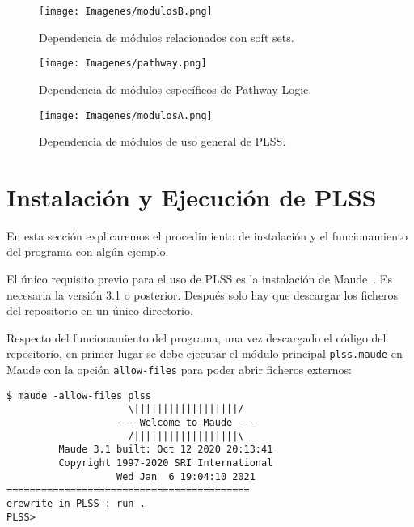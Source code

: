 \begin{figure}[h!]
	\centering
	\texttt{[image: Imagenes/modulosB.png]}
	\caption[Dependencia de módulos relacionados con soft sets]{Dependencia de módulos relacionados con soft sets.}
	\label{fig:modulosB}
\end{figure}


\begin{sidewaysfigure}
	\texttt{[image: Imagenes/pathway.png]}
	\caption[Dependencia de módulos específicos de Pathway Logic]{Dependencia de módulos específicos de Pathway Logic.}
	\label{fig:modulosPL}
\end{sidewaysfigure}

\begin{sidewaysfigure}
	\texttt{[image: Imagenes/modulosA.png]}
	\caption[Dependencia de módulos de uso general de PLSS]{Dependencia de módulos de uso general de PLSS.}
	\label{fig:modulosA}
\end{sidewaysfigure}



\section{Instalación y Ejecución de PLSS}

En esta sección explicaremos el procedimiento de instalación y el funcionamiento del programa con algún ejemplo. 
\smallskip

El único requisito previo para el uso de PLSS es la instalación de Maude~\citep{maude30}.
Es necesaria la versión 3.1 o posterior.
Después solo hay que descargar los ficheros del repositorio en un único directorio.
\medskip

Respecto del funcionamiento del programa, 
una vez descargado el código del repositorio,
en primer lugar se debe ejecutar el módulo principal \texttt{plss.maude} en Maude con la opción \texttt{allow-files} para poder abrir ficheros externos:
\begin{lstlisting}[language=Maude]
$ maude -allow-files plss
		             \||||||||||||||||||/
		           --- Welcome to Maude ---
		             /||||||||||||||||||\
	     Maude 3.1 built: Oct 12 2020 20:13:41
	     Copyright 1997-2020 SRI International
		           Wed Jan  6 19:04:10 2021
==========================================
erewrite in PLSS : run .
PLSS>
\end{lstlisting}
\medskip

